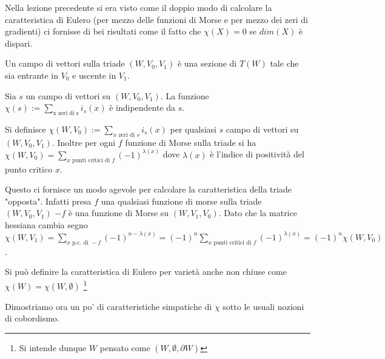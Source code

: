 Nella lezione precedente si era visto come il doppio modo di calcolare la caratteristica di Eulero (per mezzo delle funzioni di Morse e per mezzo dei zeri di gradienti) ci fornisse di bei risultati come il fatto che $\chi(X)=0$ se $dim(X)$ è dispari.\\

\begin{defn}
Un campo di vettori sulla triade $(W, V_0, V_1)$ è una sezione di $T(W)$ tale che sia entrante in $V_0$ e uscente in $V_1$.
\end{defn}
\begin{teo}
Sia $s$ un campo di vettori su $(W, V_0, V_1)$. La funzione $\chi(s):=\sum_{\text{x zeri di s}} i_s(x)$ è indipendente da $s$.
\end{teo}
\begin{defn}
Si definisce $\chi(W, V_0):=\sum_{x\text{ zeri di }s} i_s(x)$ per qualsiasi $s$ campo di vettori su $(W, V_0, V_1)$. Inoltre per ogni $f$ funzione di Morse sulla triade si ha $\chi(W, V_0)=\sum_{x\text{ punti critici di }f} (-1)^{\lambda(x)}$ dove $\lambda(x)$ è l'indice di positività del punto critico $x$.
\end{defn}
\begin{oss}
Questo ci fornisce un modo agevole per calcolare la caratteristica della triade "opposta". Infatti presa $f$ una qualsiasi funzione di morse sulla triade $(W, V_0, V_1)$ $-f$ è una funzione di Morse su $(W, V_1, V_0)$. Dato che la matrice hessiana cambia segno $\chi(W, V_1)=\sum_{x\text{ p.c. di }-f} (-1)^{n-\lambda(x)}=(-1)^n\sum_{x\text{ punti critici di }f}(-1)^{\lambda(x)}=(-1)^n\chi(W, V_0)$.  
\end{oss}

\begin{defn}
Si può definire la caratteristica di Eulero per varietà anche non chiuse come $\chi(W)=\chi(W, \emptyset)$
\footnote{Si intende dunque $W$ pensato come $(W,\emptyset, \partial W)$}
\end{defn}

Dimostriamo ora un po' di caratteristiche simpatiche di $\chi$ sotto le usuali nozioni di cobordismo.

